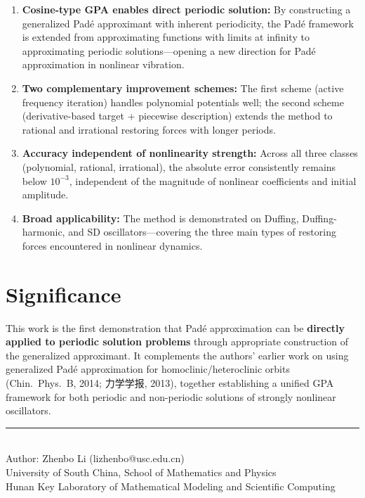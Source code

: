 \documentclass[11pt,a4paper]{article}
\begin{document}
\begin{enumerate}[leftmargin=2em]
\item \textbf{Cosine-type GPA enables direct periodic solution:} By constructing a generalized Pad\'e approximant with inherent periodicity, the Pad\'e framework is extended from approximating functions with limits at infinity to approximating periodic solutions---opening a new direction for Pad\'e approximation in nonlinear vibration.

\item \textbf{Two complementary improvement schemes:} The first scheme (active frequency iteration) handles polynomial potentials well; the second scheme (derivative-based target + piecewise description) extends the method to rational and irrational restoring forces with longer periods.

\item \textbf{Accuracy independent of nonlinearity strength:} Across all three classes (polynomial, rational, irrational), the absolute error consistently remains below $10^{-3}$, independent of the magnitude of nonlinear coefficients and initial amplitude.

\item \textbf{Broad applicability:} The method is demonstrated on Duffing, Duffing-harmonic, and SD oscillators---covering the three main types of restoring forces encountered in nonlinear dynamics.
\end{enumerate}

\section{Significance}

This work is the first demonstration that Pad\'e approximation can be \textbf{directly applied to periodic solution problems} through appropriate construction of the generalized approximant. It complements the authors' earlier work on using generalized Pad\'e approximation for homoclinic/heteroclinic orbits (Chin.\ Phys.\ B, 2014; 力学学报, 2013), together establishing a unified GPA framework for both periodic and non-periodic solutions of strongly nonlinear oscillators.

\vfill
\begin{center}
\small\rule{0.5\textwidth}{0.3pt}\\[4pt]
\small\color{primary} Author: Zhenbo Li (lizhenbo@usc.edu.cn)\\
\small University of South China, School of Mathematics and Physics\\
\small Hunan Key Laboratory of Mathematical Modeling and Scientific Computing
\end{center}
\end{document}

